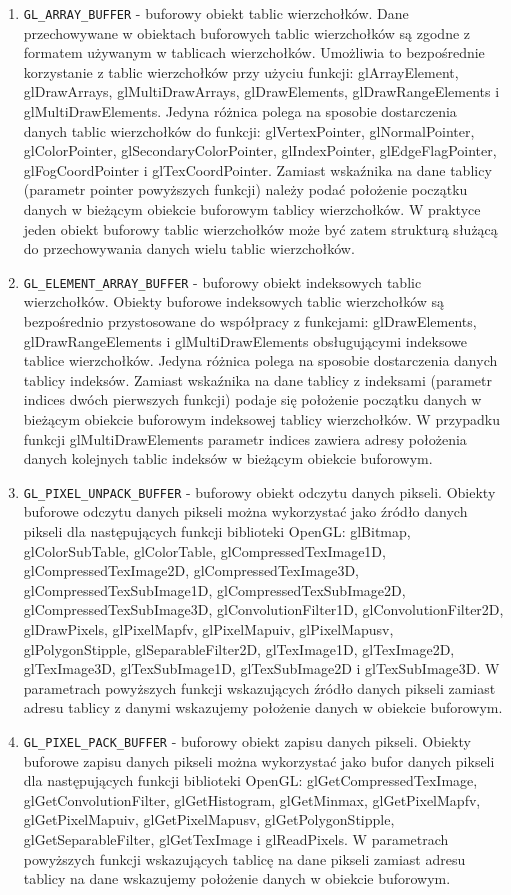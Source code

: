 \begin{enumerate}
\item \verb$GL_ARRAY_BUFFER$ - buforowy obiekt tablic wierzchołków. Dane przechowywane w obiektach buforowych tablic wierzchołków są zgodne z formatem używanym w tablicach wierzchołków. Umożliwia to bezpośrednie korzystanie z tablic wierzchołków przy użyciu funkcji: glArrayElement, glDrawArrays, glMultiDrawArrays, glDrawElements, glDrawRangeElements i glMultiDrawElements. Jedyna różnica polega na sposobie dostarczenia danych tablic wierzchołków do funkcji: glVertexPointer, glNormalPointer, glColorPointer, glSecondaryColorPointer, glIndexPointer, glEdgeFlagPointer, glFogCoordPointer i glTexCoordPointer. Zamiast wskaźnika na dane tablicy (parametr pointer powyższych funkcji) należy podać położenie początku danych w bieżącym obiekcie buforowym tablicy wierzchołków. W praktyce jeden obiekt buforowy tablic wierzchołków może być zatem strukturą służącą do przechowywania danych wielu tablic wierzchołków.
\item \verb$GL_ELEMENT_ARRAY_BUFFER$ - buforowy obiekt indeksowych tablic wierzchołków. Obiekty buforowe indeksowych tablic wierzchołków są bezpośrednio przystosowane do współpracy z funkcjami: glDrawElements, glDrawRangeElements i glMultiDrawElements obsługującymi indeksowe tablice wierzchołków. Jedyna różnica polega na sposobie dostarczenia danych tablicy indeksów. Zamiast wskaźnika na dane tablicy z indeksami (parametr indices dwóch pierwszych funkcji) podaje się położenie początku danych w bieżącym obiekcie buforowym indeksowej tablicy wierzchołków. W przypadku funkcji glMultiDrawElements parametr indices zawiera adresy położenia danych kolejnych tablic indeksów w bieżącym obiekcie buforowym.
\item \verb$GL_PIXEL_UNPACK_BUFFER$ - buforowy obiekt odczytu danych pikseli. Obiekty buforowe odczytu danych pikseli można wykorzystać jako źródło danych pikseli dla następujących funkcji biblioteki OpenGL: glBitmap, glColorSubTable, glColorTable, glCompressedTexImage1D, glCompressedTexImage2D, glCompressedTexImage3D, glCompressedTexSubImage1D, glCompressedTexSubImage2D, glCompressedTexSubImage3D, glConvolutionFilter1D, glConvolutionFilter2D, glDrawPixels, glPixelMapfv, glPixelMapuiv, glPixelMapusv, glPolygonStipple, glSeparableFilter2D, glTexImage1D, glTexImage2D, glTexImage3D, glTexSubImage1D, glTexSubImage2D i glTexSubImage3D.
W parametrach powyższych funkcji wskazujących źródło danych pikseli zamiast adresu tablicy z danymi wskazujemy położenie danych w obiekcie buforowym.
\item \verb$GL_PIXEL_PACK_BUFFER$ - buforowy obiekt zapisu danych pikseli. Obiekty buforowe zapisu danych pikseli można wykorzystać jako bufor danych pikseli dla następujących funkcji biblioteki OpenGL: glGetCompressedTexImage, glGetConvolutionFilter, glGetHistogram, glGetMinmax, glGetPixelMapfv, glGetPixelMapuiv, glGetPixelMapusv, glGetPolygonStipple, glGetSeparableFilter, glGetTexImage i glReadPixels.
W parametrach powyższych funkcji wskazujących tablicę na dane pikseli zamiast adresu tablicy na dane wskazujemy położenie danych w obiekcie buforowym.
\end{enumerate}
